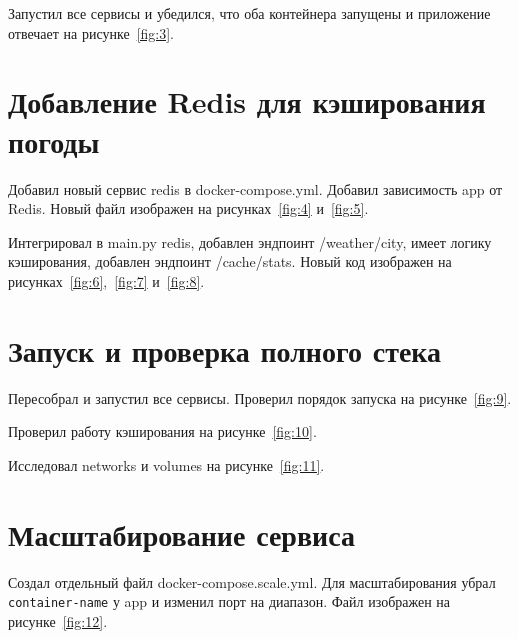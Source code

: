Запустил все сервисы и убедился, что оба контейнера запущены и приложение отвечает на рисунке~\ref{fig:3}.


\section{Добавление Redis для кэширования погоды}

Добавил новый сервис redis в docker-compose.yml. Добавил зависимость app от Redis. Новый файл изображен на рисунках~\ref{fig:4} и~\ref{fig:5}.


Интегрировал в main.py redis, добавлен эндпоинт /weather/{city}, имеет логику кэширования, добавлен эндпоинт /cache/stats. Новый код изображен на рисунках~\ref{fig:6},~\ref{fig:7} и~\ref{fig:8}.


\section{Запуск и проверка полного стека}

Пересобрал и запустил все сервисы. Проверил порядок запуска на рисунке~\ref{fig:9}.


Проверил работу кэширования на рисунке~\ref{fig:10}.


Исследовал networks и volumes на рисунке~\ref{fig:11}.


\section{Масштабирование сервиса}

Создал отдельный файл docker-compose.scale.yml. Для масштабирования убрал \texttt{container-name} у app и изменил порт на диапазон. Файл изображен на рисунке~\ref{fig:12}.


